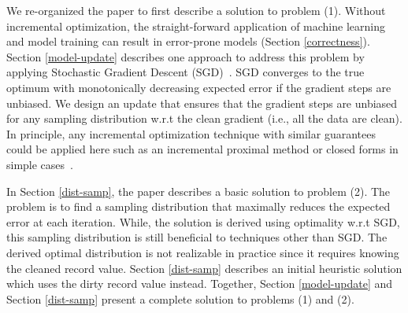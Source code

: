 




We re-organized the paper to first describe a solution to problem (1).
Without incremental optimization, the straight-forward application of machine learning and model training can result in error-prone models (Section \ref{correctness}).
Section \ref{model-update} describes one approach to address this problem by applying Stochastic Gradient Descent (SGD)~.
SGD converges to the true optimum with monotonically decreasing expected error if the gradient steps are unbiased.
We design an update that ensures that the gradient steps are unbiased for any sampling distribution w.r.t the clean gradient (i.e., all the data are clean).
In principle, any incremental optimization technique with similar guarantees could be applied here such as an incremental proximal method or closed forms in simple cases~.

In Section \ref{dist-samp}, the paper describes a basic solution to problem (2).
The problem is to find a sampling distribution that maximally reduces the expected error
at each iteration.
While, the solution is derived using optimality w.r.t SGD, this sampling distribution is still beneficial to techniques other than SGD.
The derived optimal distribution is not realizable in practice since it requires knowing the cleaned record value.
Section \ref{dist-samp} describes an initial heuristic solution which uses the dirty record value instead.
Together, Section \ref{model-update} and Section  \ref{dist-samp} present a complete solution to problems (1) and (2).

